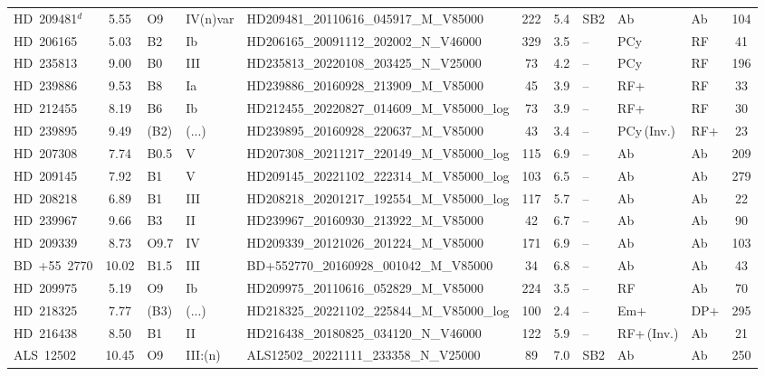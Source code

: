 {\begin{landscape}
\begin{longtable}{lclllcclllc}
\noalign{\smallskip}
HD~209481$^{d}$ & 5.55 & O9 & IV(n)var & HD209481\_20110616\_045917\_M\_V85000 & 222 & 5.4 & SB2 & Ab & Ab & 104 \\
\noalign{\smallskip}
HD~206165 & 5.03 & B2 & Ib & HD206165\_20091112\_202002\_N\_V46000 & 329 & 3.5 & -- & PCy & RF & 41 \\
\noalign{\smallskip}
HD~235813 & 9.00 & B0 & III & HD235813\_20220108\_203425\_N\_V25000 & 73 & 4.2 & -- & PCy & RF & 196 \\
\noalign{\smallskip}
HD~239886 & 9.53 & B8 & Ia & HD239886\_20160928\_213909\_M\_V85000 & 45 & 3.9 & -- & RF+ & RF & 33 \\
\noalign{\smallskip}
HD~212455 & 8.19 & B6 & Ib & HD212455\_20220827\_014609\_M\_V85000\_log & 73 & 3.9 & -- & RF+ & RF & 30 \\
\noalign{\smallskip}
HD~239895 & 9.49 & (B2) & (...) & HD239895\_20160928\_220637\_M\_V85000 & 43 & 3.4 & -- & PCy\,(Inv.) & RF+ & 23 \\
\noalign{\smallskip}
HD~207308 & 7.74 & B0.5 & V & HD207308\_20211217\_220149\_M\_V85000\_log & 115 & 6.9 & -- & Ab & Ab & 209 \\
\noalign{\smallskip}
HD~209145 & 7.92 & B1 & V & HD209145\_20221102\_222314\_M\_V85000\_log & 103 & 6.5 & -- & Ab & Ab & 279 \\
\noalign{\smallskip}
HD~208218 & 6.89 & B1 & III & HD208218\_20201217\_192554\_M\_V85000\_log & 117 & 5.7 & -- & Ab & Ab & 22 \\
\noalign{\smallskip}
HD~239967 & 9.66 & B3 & II & HD239967\_20160930\_213922\_M\_V85000 & 42 & 6.7 & -- & Ab & Ab & 90 \\
\noalign{\smallskip}
HD~209339 & 8.73 & O9.7 & IV & HD209339\_20121026\_201224\_M\_V85000 & 171 & 6.9 & -- & Ab & Ab & 103 \\
\noalign{\smallskip}
BD~+55~2770 & 10.02 & B1.5 & III & BD+552770\_20160928\_001042\_M\_V85000 & 34 & 6.8 & -- & Ab & Ab & 43 \\
\noalign{\smallskip}
HD~209975 & 5.19 & O9 & Ib & HD209975\_20110616\_052829\_M\_V85000 & 224 & 3.5 & -- & RF & Ab & 70 \\
\noalign{\smallskip}
HD~218325 & 7.77 & (B3) & (...) & HD218325\_20221102\_225844\_M\_V85000\_log & 100 & 2.4 & -- & Em+ & DP+ & 295 \\
\noalign{\smallskip}
HD~216438 & 8.50 & B1 & II & HD216438\_20180825\_034120\_N\_V46000 & 122 & 5.9 & -- & RF+\,(Inv.) & Ab & 21 \\
\noalign{\smallskip}
ALS~12502 & 10.45 & O9 & III:(n) & ALS12502\_20221111\_233358\_N\_V25000 & 89 & 7.0 & SB2 & Ab & Ab & 250 \\

\end{longtable}
\end{landscape}}
